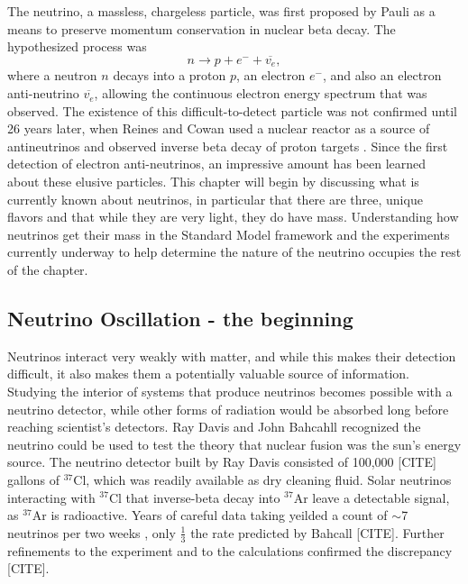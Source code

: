 The neutrino, a massless, chargeless particle, was first proposed by Pauli \cite{Pauli} as a means to preserve momentum conservation in nuclear beta decay.  The hypothesized process was
\begin{equation}
n \rightarrow p + e^- + \overline{v_e},
\end{equation}
where a neutron $n$ decays into a proton $p$, an electron $e^-$, and also an electron anti-neutrino $\overline{v_e}$, allowing the continuous electron energy spectrum that was observed. The existence of this difficult-to-detect particle was not confirmed until 26 years later, when Reines and Cowan used a nuclear reactor as a source of antineutrinos and observed inverse beta decay of proton targets \cite{poltergeist}.  Since the first detection of electron anti-neutrinos, an impressive amount has been learned about these elusive particles.  This chapter will begin by discussing what is currently known about neutrinos, in particular that there are three, unique flavors and that while they are very light, they do have mass.  Understanding how neutrinos get their mass in the Standard Model framework and the experiments currently underway to help determine the nature of the neutrino occupies the rest of the chapter.

\subsection{Neutrino Oscillation - the beginning}
Neutrinos interact very weakly with matter, and while this makes their detection difficult, it also makes them a potentially valuable source of information.  Studying the interior of systems that produce neutrinos becomes possible with a neutrino detector, while other forms of radiation would be absorbed long before reaching scientist's detectors.  Ray Davis and John Bahcahll recognized the neutrino could be used to test the theory that nuclear fusion was the sun's energy source.  The neutrino detector built by Ray Davis consisted of 100,000 [CITE] gallons of $^{37}$Cl, which was readily available as dry cleaning fluid.  Solar neutrinos interacting with $^{37}$Cl that inverse-beta decay into $^{37}$Ar leave a detectable signal, as $^{37}$Ar is radioactive.  Years of careful data taking yeilded a count of $\sim$7 neutrinos per two weeks \cite{Davis}, only $\frac{1}{3}$ the rate predicted by Bahcall [CITE].  Further refinements to the experiment and to the calculations confirmed the discrepancy [CITE].

